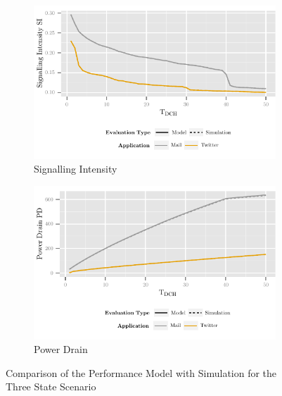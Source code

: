 \begin{figure}
	\begin{subfigure}[b]{\textwidth}
	\centering
	\includegraphics{network/performance_model/numerical_examples/figures/3state_tdch_si_analytic_simulative}
	\caption{Signalling Intensity}\label{fig:network:performance_model:numerical_examples:validations:analytic_vs_simulation:signalling_intensity}
	\end{subfigure}

	\begin{subfigure}[b]{\textwidth}
	\centering
	\includegraphics{network/performance_model/numerical_examples/figures/3state_tdch_pd_analytic_simulative}
	\caption{Power Drain}\label{fig:network:performance_model:numerical_examples:validations:analytic_vs_simulation:power_drain}
	\end{subfigure}

	\caption{Comparison of the Performance Model with  Simulation for the Three State Scenario}\label{fig:network:performance_model:numerical_examples:validations:analytic_vs_simulation}
\end{figure}

